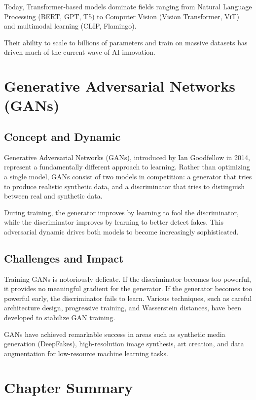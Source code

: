 \documentclass[openany]{book}
\begin{document}
Today, Transformer-based models dominate fields ranging from Natural Language 
Processing (BERT, GPT, T5) to Computer Vision (Vision Transformer, ViT) and 
multimodal learning (CLIP, Flamingo).

Their ability to scale to billions of parameters and train on massive datasets 
has driven much of the current wave of AI innovation.

\section{Generative Adversarial Networks (GANs)}

\subsection{Concept and Dynamic}

Generative Adversarial Networks (GANs), introduced by Ian Goodfellow in 2014, 
represent a fundamentally different approach to learning. Rather than optimizing 
a single model, GANs consist of two models in competition: a generator that 
tries to produce realistic synthetic data, and a discriminator that tries to 
distinguish between real and synthetic data.

During training, the generator improves by learning to fool the discriminator, 
while the discriminator improves by learning to better detect fakes. This 
adversarial dynamic drives both models to become increasingly sophisticated.

\subsection{Challenges and Impact}

Training GANs is notoriously delicate. If the discriminator becomes too 
powerful, it provides no meaningful gradient for the generator. If the generator 
becomes too powerful early, the discriminator fails to learn. Various 
techniques, such as careful architecture design, progressive training, and 
Wasserstein distances, have been developed to stabilize GAN training.

GANs have achieved remarkable success in areas such as synthetic media 
generation (DeepFakes), high-resolution image synthesis, art creation, and data 
augmentation for low-resource machine learning tasks.

\section{Chapter Summary}
\end{document}
